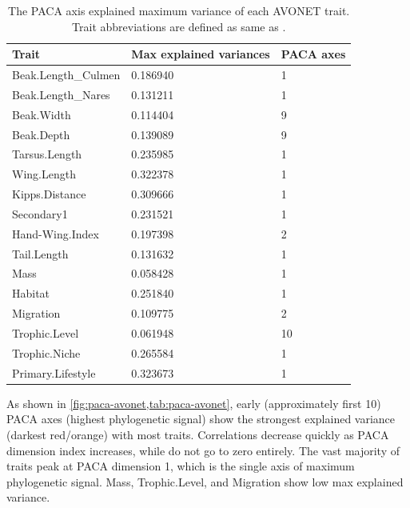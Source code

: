 \begin{table}[htbp]
  \centering
  \caption{The PACA axis explained maximum variance of each AVONET trait. Trait abbreviations are defined as same as \textcite{tobias2022avonet}. }
  \label{tab:paca-avonet}
  \begin{tabular}{lll}
    \toprule         
    Trait & Max explained variances  &  PACA axes \\ 
    \midrule                   
    Beak.Length\_Culmen & 0.186940 &            1 \\ 
    Beak.Length\_Nares  & 0.131211 &            1 \\ 
    Beak.Width          & 0.114404 &            9 \\ 
    Beak.Depth          & 0.139089 &            9 \\ 
    Tarsus.Length       & 0.235985 &            1 \\ 
    Wing.Length         & 0.322378 &            1 \\ 
    Kipps.Distance      & 0.309666 &            1 \\ 
    Secondary1          & 0.231521 &            1 \\ 
    Hand-Wing.Index     & 0.197398 &            2 \\ 
    Tail.Length         & 0.131632 &            1 \\ 
    Mass                & 0.058428 &            1 \\ 
    Habitat             & 0.251840 &            1 \\ 
    Migration           & 0.109775 &            2 \\ 
    Trophic.Level       & 0.061948 &           10 \\ 
    Trophic.Niche       & 0.265584 &            1 \\ 
    Primary.Lifestyle   & 0.323673 &            1 \\ 
    \bottomrule                 
  \end{tabular}
\end{table}

As shown in \cref{fig:paca-avonet,tab:paca-avonet}, early (approximately first 10) PACA axes (highest phylogenetic signal) show the strongest explained variance (darkest red/orange) with most traits. Correlations decrease quickly as PACA dimension index increases, while do not go to zero entirely. The vast majority of traits peak at PACA dimension 1, which is the single axis of maximum phylogenetic signal. Mass, Trophic.Level, and Migration show low max explained variance.


